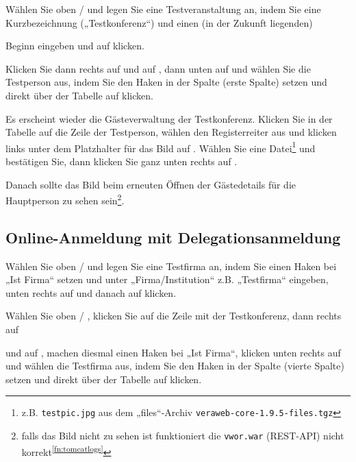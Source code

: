 \documentclass{tarentanleitung}
\newcommand{\vwiaverssw}{1.9.5}
\begin{document}
Wählen Sie oben  /  und legen Sie eine Testveranstaltung an, indem Sie eine
Kurzbezeichnung („Testkonferenz“) und einen (in der Zukunft liegenden)
\strut Beginn eingeben und auf 
klicken.

Klicken Sie dann rechts auf  und auf
, dann unten auf 
und wählen Sie die Testperson aus, indem Sie den Haken in der Spalte
 (erste Spalte) setzen und direkt über der Tabelle auf
 klicken.

Es erscheint wieder die Gästeverwaltung der Testkonferenz. Klicken Sie
in der Tabelle auf die Zeile der Testperson, wählen den Registerreiter
 aus und klicken links unter dem Platzhalter
für das Bild auf . Wählen Sie eine
Datei\Hair\footnote{\label{fn:testpic}z.B. \texttt{testpic.jpg} aus dem
„files“-Archiv \texttt{veraweb-core-\vwiaverssw{}-files.tgz}} und bestätigen
Sie, dann klicken Sie ganz unten rechts auf .
\strut Danach sollte das Bild beim erneuten Öffnen der Gästedetails für
die Hauptperson zu sehen sein\Hair\footnote{falls das Bild nicht
zu sehen ist funktioniert die \texttt{vwor.war} (REST-API) nicht
korrekt\Hair\textsuperscript{\ref{fn:tomcatlogs}}}.

\subsection{Online-Anmeldung mit Delegationsanmeldung}

Wählen Sie oben  / 
und legen Sie eine Testfirma an, indem Sie einen Haken bei „Ist Firma“
setzen und unter „Firma/Institution“ z.B. „Testfirma“ eingeben, unten
rechts auf  und danach auf
 klicken.

\strut Wählen Sie oben  /
, klicken Sie auf die Zeile mit
der Testkonferenz, dann rechts auf 
\strut und auf , machen diesmal einen
Haken bei „Ist Firma“, klicken unten rechts auf 
und wählen die Testfirma aus, indem Sie den Haken in der Spalte
 (vierte Spalte) setzen und direkt über der Tabelle
auf  klicken.
\end{document}
